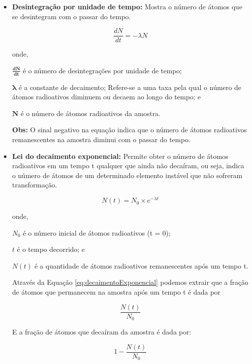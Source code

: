 \documentclass[11pt,a4paper]{article}
\begin{document}
		\begin{itemize}
			\item \textbf{Desintegração por unidade de tempo:} Mostra o número de átomos que se desintegram com o passar do tempo. 

				\begin{equation}
					\frac{dN}{dt} = -\lambda N
					\label{eq:DesintegraçãoPorUnidadeDeTempo}
				\end{equation}
		
				onde, 

				$\mathbf{\frac{dN}{dt}}$ é o número de desintegrações por unidade de tempo;

				$\mathbf{\lambda}$ é a constante de decaimento; Refere-se a uma taxa pela qual o número de átomos radioativos diminuem ou decaem ao longo do tempo; e

				$\mathbf{N}$ é o número de átomos radioativos da amostra.

				\textbf{\textcolor{CarnationPink}{Obs:}} O sinal negativo na equação indica que o número de átomos radioativos remanescentes na amostra diminui com o passar do tempo. 

			\item \textbf{Lei do decaimento exponencial: } Permite obter o número de átomos radioativos em  um tempo t qualquer que ainda não decaíram, ou seja, indica o número de átomos de um determinado elemento instável que não sofreram transformação.

				\begin{equation}
					N(t) = N_0 \times e^{-\lambda t}
					\label{eq:decaimentoExponencial}
				\end{equation}
				
				onde,

				$N_0$ é o número inicial de átomos radioativos (t = 0);
				
				$t$ é o tempo decorrido; e

				$N(t)$ é a quantidade de átomos radioativos remanescentes após um tempo t.

				Através da Equação \ref{eq:decaimentoExponencial} podemos extrair que a fração de átomos que permanecem na amostra após um tempo t é dada por 

				\begin{equation}
					\frac{N(t)}{N_0}
				\end{equation}

				E a fração de átomos que decaíram da amostra é dada por:

				\begin{equation}
					1 - \frac{N(t)}{N_0}
				\end{equation}


\end{itemize}
\end{document}
